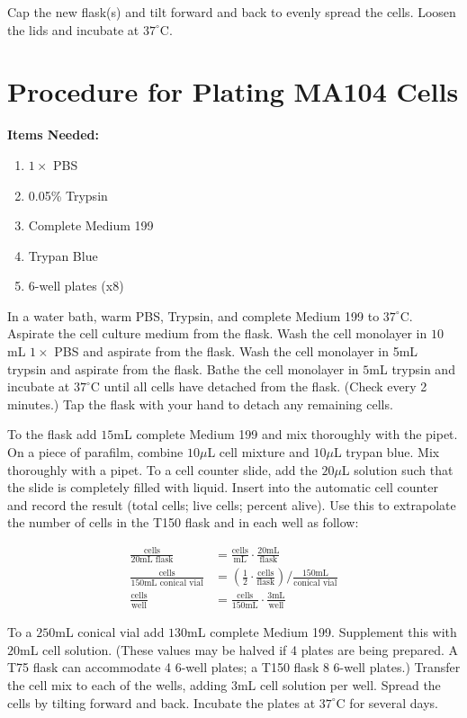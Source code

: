 Cap the new flask(s) and tilt forward and back to evenly spread the cells. Loosen the lids and incubate at $37^{\circ}$C.

\section{Procedure for Plating MA104 Cells}

{\bfseries Items Needed:} \begin{enumerate}
	\item $1\times$ PBS
	\item 0.05\% Trypsin
	\item Complete Medium 199
	\item Trypan Blue
	\item 6-well plates (x8)
\end{enumerate}

In a water bath, warm PBS, Trypsin, and complete Medium 199 to $37^{\circ}$C. Aspirate the cell culture medium from the flask. Wash the cell monolayer in $10$mL $1\times$ PBS and aspirate from the flask. Wash the cell monolayer in 5mL trypsin and aspirate from the flask. Bathe the cell monolayer in $5$mL trypsin and incubate at $37^{\circ}$C until all cells have detached from the flask. (Check every 2 minutes.) Tap the flask with your hand to detach any remaining cells.

To the flask add $15$mL complete Medium 199 and mix thoroughly with the pipet. On a piece of parafilm, combine $10\mu$L cell mixture and $10\mu$L trypan blue. Mix thoroughly with a pipet. To a cell counter slide, add the $20\mu$L solution such that the slide is completely filled with liquid. Insert into the automatic cell counter and record the result (total cells; live cells; percent alive). Use this to extrapolate the number of cells in the T150 flask and in each well as follow:

\begin{align*}
\frac{\text{cells}}{20\text{mL flask}} &= \frac{\text{cells}}{\text{mL}}\cdot \frac{20\text{mL}}{\text{flask}}\\
\frac{\text{cells}}{150\text{mL conical vial}} &= \left(\frac{1}{2}\cdot\frac{\text{cells}}{\text{flask}}\right)/\frac{150\text{mL}}{\text{conical vial}}\\
\frac{\text{cells}}{\text{well}} &= \frac{\text{cells}}{150\text{mL}}\cdot\frac{3\text{mL}}{\text{well}}
\end{align*}

To a $250$mL conical vial add $130$mL complete Medium 199. Supplement this with $20$mL cell solution. (These values may be halved if 4 plates are being prepared. A T75 flask can accommodate 4 6-well plates; a T150 flask 8 6-well plates.) Transfer the cell mix to each of the wells, adding $3$mL cell solution per well. Spread the cells by tilting forward and back. Incubate the plates at $37^{\circ}$C for several days.


